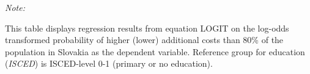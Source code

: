 \begin{table}[htbp!]
\begin{adjustbox}{width = 1\textwidth, max height = 0.95\textheight, center}
\begin{threeparttable}[b]
         \begin{tablenotes}\item \medskip \textit{Note:}
            \item This table displays regression results from equation LOGIT on the log-odds transformed probability of higher (lower) additional costs than 80\% of the population in Slovakia as the dependent variable. Reference group for education (\textit{ISCED}) is ISCED-level 0-1 (primary or no education).
         \end{tablenotes}
      \end{threeparttable}
   \end{adjustbox}
\end{table}


